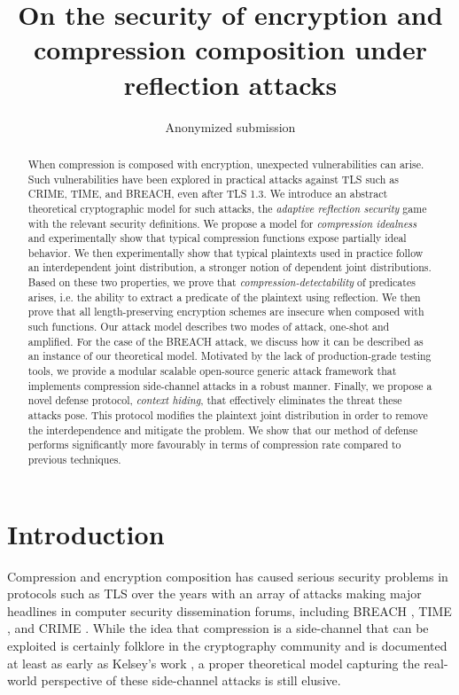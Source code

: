 \documentclass[conference, letterpaper, 10pt]{IEEEtran}
\title{On the security of encryption and compression composition under reflection attacks}
\author{
    Anonymized submission
}
\begin{document}
\maketitle

\begin{abstract}
When compression is composed with encryption, unexpected vulnerabilities can
arise. Such vulnerabilities have been explored in practical attacks against TLS
such as CRIME, TIME, and BREACH, even after TLS 1.3. We introduce an abstract
theoretical cryptographic model for such attacks, the \textit{adaptive
reflection security} game with the relevant security definitions. We propose a
model for \textit{compression idealness} and experimentally show that typical compression
functions expose partially ideal behavior. We then experimentally show that
typical plaintexts used in practice follow an interdependent joint distribution,
a stronger notion of dependent joint distributions. Based on these two
properties, we prove that \textit{compression-detectability} of predicates
arises, i.e. the ability to extract a predicate of the plaintext using reflection.
We then prove that all length-preserving encryption schemes are insecure when
composed with such functions. Our attack model describes two modes of attack,
one-shot and amplified. For the case of the BREACH attack, we discuss how it can
be described as an instance of our theoretical model. Motivated by the lack of
production-grade testing tools, we provide a modular scalable open-source
generic attack framework that implements compression side-channel attacks in a
robust manner. Finally, we propose a novel defense protocol, \textit{context
hiding}, that effectively eliminates the threat these attacks pose. This
protocol modifies the plaintext joint distribution in order to remove the
interdependence and mitigate the problem. We show that our method of
defense performs significantly more favourably in terms of compression rate
compared to previous techniques.
\end{abstract}

\section{Introduction}\label{sec:prev}

Compression and encryption composition has caused serious security problems
in protocols such as TLS \cite{c1} over the years
with an array of attacks making major headlines in computer security dissemination forums,
including BREACH \cite{c2}, TIME \cite{c3}, and CRIME \cite{c4}.
While the idea that compression is a side-channel that can be exploited
is certainly folklore in the cryptography community and is documented
at least as early as Kelsey's work \cite{c12},
a proper theoretical model  capturing the real-world perspective
of these side-channel attacks is still elusive.
\end{document}

